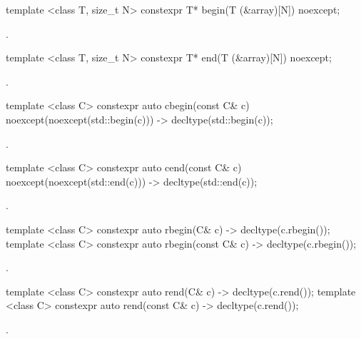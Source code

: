 %
\begin{itemdecl}
template <class T, size_t N> constexpr T* begin(T (&array)[N]) noexcept;
\end{itemdecl}

\begin{itemdescr}
\pnum
\returns {}.
\end{itemdescr}

%
\begin{itemdecl}
template <class T, size_t N> constexpr T* end(T (&array)[N]) noexcept;
\end{itemdecl}

\begin{itemdescr}
\pnum
\returns {}.
\end{itemdescr}

%
\begin{itemdecl}
template <class C> constexpr auto cbegin(const C& c) noexcept(noexcept(std::begin(c)))
  -> decltype(std::begin(c));
\end{itemdecl}
\begin{itemdescr}
\pnum \returns {}.
\end{itemdescr}

%
\begin{itemdecl}
template <class C> constexpr auto cend(const C& c) noexcept(noexcept(std::end(c)))
  -> decltype(std::end(c));
\end{itemdecl}
\begin{itemdescr}
\pnum \returns {}.
\end{itemdescr}

%
\begin{itemdecl}
template <class C> constexpr auto rbegin(C& c) -> decltype(c.rbegin());
template <class C> constexpr auto rbegin(const C& c) -> decltype(c.rbegin());
\end{itemdecl}
\begin{itemdescr}
\pnum \returns {}.
\end{itemdescr}

%
\begin{itemdecl}
template <class C> constexpr auto rend(C& c) -> decltype(c.rend());
template <class C> constexpr auto rend(const C& c) -> decltype(c.rend());
\end{itemdecl}
\begin{itemdescr}
\pnum \returns {}.
\end{itemdescr}

